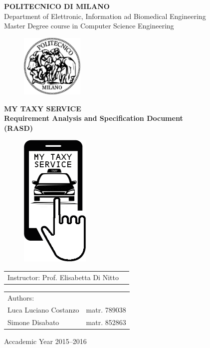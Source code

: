 \documentclass[a4paper]{report}
\begin{document}
\begin{titlepage}

\begin{center}
\LARGE
\textbf{POLITECNICO DI MILANO} \\
\Large
Department of Elettronic, Information ad Biomedical Engineering \\
Master Degree course in Computer Science Engineering
\end{center}

\addvspace{1.5cm}
\begin{figure}[h]
\begin{center}
\includegraphics[width=3cm]{figures/PoliMi}
\end{center}
\end{figure}

\addvspace{0.75cm}
\begin{center}
\LARGE
\textbf{MY TAXY SERVICE \\ Requirement Analysis and Specification Document \\ (RASD)}
\begin{figure}[h]
	\centerline{\includegraphics[scale = 0.5]{figures/logo3.png}}
\end{figure}
\end{center}


\Large
\begin{tabular}{p{}p{}}
Instructor: Prof. Elisabetta Di Nitto & \\
\end{tabular}

\addvspace{1cm}

\Large
\begin{tabular}{p{}p{}}
Authors: & \\
Luca Luciano Costanzo & matr. 789038 \\
Simone Disabato & matr. 852863 
\end{tabular}

\addvspace{2cm}
\Large
\begin{center}
Accademic Year 2015--2016
\end{center}

\end{titlepage}
\end{document}
